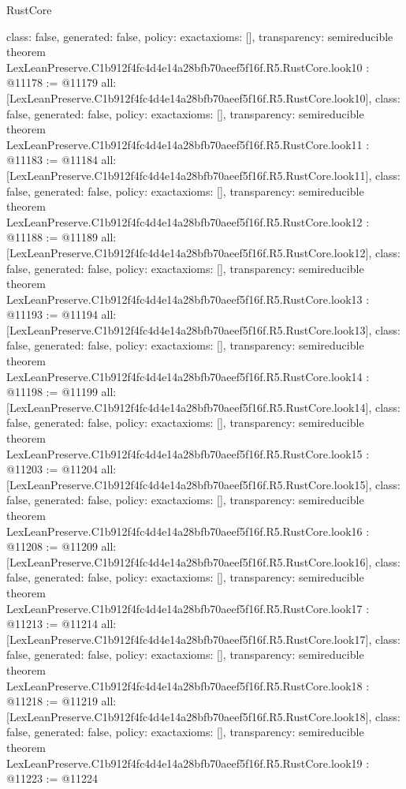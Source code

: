 \begin{lexlean}{RustCore}
\begin{coremodule}
{  class: false,
  generated: false,
  policy: exact{axioms: []},
  transparency: semireducible
}
theorem LexLeanPreserve.C1b912f4fc4d4e14a28bfb70aeef5f16f.R5.RustCore.look10 : @11178 := @11179 {
  all: [LexLeanPreserve.C1b912f4fc4d4e14a28bfb70aeef5f16f.R5.RustCore.look10],
  class: false,
  generated: false,
  policy: exact{axioms: []},
  transparency: semireducible
}
theorem LexLeanPreserve.C1b912f4fc4d4e14a28bfb70aeef5f16f.R5.RustCore.look11 : @11183 := @11184 {
  all: [LexLeanPreserve.C1b912f4fc4d4e14a28bfb70aeef5f16f.R5.RustCore.look11],
  class: false,
  generated: false,
  policy: exact{axioms: []},
  transparency: semireducible
}
theorem LexLeanPreserve.C1b912f4fc4d4e14a28bfb70aeef5f16f.R5.RustCore.look12 : @11188 := @11189 {
  all: [LexLeanPreserve.C1b912f4fc4d4e14a28bfb70aeef5f16f.R5.RustCore.look12],
  class: false,
  generated: false,
  policy: exact{axioms: []},
  transparency: semireducible
}
theorem LexLeanPreserve.C1b912f4fc4d4e14a28bfb70aeef5f16f.R5.RustCore.look13 : @11193 := @11194 {
  all: [LexLeanPreserve.C1b912f4fc4d4e14a28bfb70aeef5f16f.R5.RustCore.look13],
  class: false,
  generated: false,
  policy: exact{axioms: []},
  transparency: semireducible
}
theorem LexLeanPreserve.C1b912f4fc4d4e14a28bfb70aeef5f16f.R5.RustCore.look14 : @11198 := @11199 {
  all: [LexLeanPreserve.C1b912f4fc4d4e14a28bfb70aeef5f16f.R5.RustCore.look14],
  class: false,
  generated: false,
  policy: exact{axioms: []},
  transparency: semireducible
}
theorem LexLeanPreserve.C1b912f4fc4d4e14a28bfb70aeef5f16f.R5.RustCore.look15 : @11203 := @11204 {
  all: [LexLeanPreserve.C1b912f4fc4d4e14a28bfb70aeef5f16f.R5.RustCore.look15],
  class: false,
  generated: false,
  policy: exact{axioms: []},
  transparency: semireducible
}
theorem LexLeanPreserve.C1b912f4fc4d4e14a28bfb70aeef5f16f.R5.RustCore.look16 : @11208 := @11209 {
  all: [LexLeanPreserve.C1b912f4fc4d4e14a28bfb70aeef5f16f.R5.RustCore.look16],
  class: false,
  generated: false,
  policy: exact{axioms: []},
  transparency: semireducible
}
theorem LexLeanPreserve.C1b912f4fc4d4e14a28bfb70aeef5f16f.R5.RustCore.look17 : @11213 := @11214 {
  all: [LexLeanPreserve.C1b912f4fc4d4e14a28bfb70aeef5f16f.R5.RustCore.look17],
  class: false,
  generated: false,
  policy: exact{axioms: []},
  transparency: semireducible
}
theorem LexLeanPreserve.C1b912f4fc4d4e14a28bfb70aeef5f16f.R5.RustCore.look18 : @11218 := @11219 {
  all: [LexLeanPreserve.C1b912f4fc4d4e14a28bfb70aeef5f16f.R5.RustCore.look18],
  class: false,
  generated: false,
  policy: exact{axioms: []},
  transparency: semireducible
}
theorem LexLeanPreserve.C1b912f4fc4d4e14a28bfb70aeef5f16f.R5.RustCore.look19 : @11223 := @11224 {
}
\end{coremodule}
\end{lexlean}
